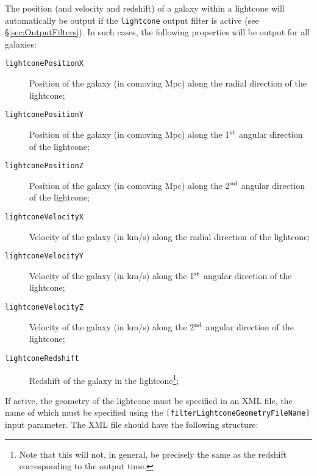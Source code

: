 The position (and velocity and redshift) of a galaxy within a lightcone will automatically be output if the {\tt lightcone} output filter is active (see \S\ref{sec:OutputFilters}). In such cases, the following properties will be output for all galaxies:
\begin{description}
 \item [{\tt lightconePositionX}] Position of the galaxy (in comoving Mpc) along the radial direction of the lightcone;
 \item [{\tt lightconePositionY}] Position of the galaxy (in comoving Mpc) along the 1$^{\rm st}$ angular direction of the lightcone;
 \item [{\tt lightconePositionZ}] Position of the galaxy (in comoving Mpc) along the 2$^{\rm nd}$ angular direction of the lightcone;
 \item [{\tt lightconeVelocityX}] Velocity of the galaxy (in km/s) along the radial direction of the lightcone;
 \item [{\tt lightconeVelocityY}] Velocity of the galaxy (in km/s) along the 1$^{\rm st}$ angular direction of the lightcone;
 \item [{\tt lightconeVelocityZ}] Velocity of the galaxy (in km/s) along the 2$^{\rm nd}$ angular direction of the lightcone;
 \item [{\tt lightconeRedshift}] Redshift of the galaxy in the lightcone\footnote{Note that this will not, in general, be precisely the same as the redshift corresponding to the output time.};
\end{description}
If active, the geometry of the lightcone must be specified in an XML file, the name of which must be specified using the {\tt [filterLightconeGeometryFileName]} input parameter. The XML file should have the following structure:
